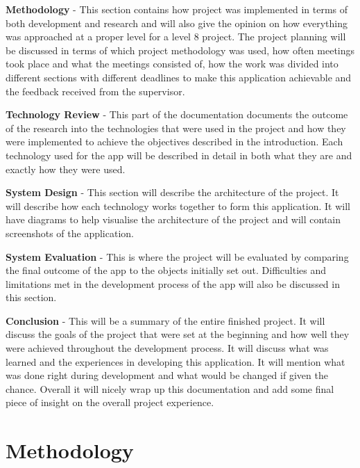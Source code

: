 \textbf {Methodology} - This section contains how project was implemented in terms of both development and research and will also give the opinion on how everything was approached at a proper level for a level 8 project. The project planning will be discussed in terms of which project methodology was used, how often meetings took place and what the meetings consisted of, how the work was divided into different sections with different deadlines to make this application achievable and the feedback received from the supervisor.


\textbf {Technology Review} - This part of the documentation documents the outcome of the research into the technologies that were used in the project and how they were implemented to achieve the objectives described in the introduction. Each technology used for the app will be described in detail in both what they are and exactly how they were used.

\textbf {System Design} - This section will describe the architecture of the project. It will describe how each technology works together to form this application. It will have diagrams to help visualise the architecture of the project and will contain screenshots of the application.

\textbf {System Evaluation} - This is where the project will be evaluated by comparing the final outcome of the app to the objects initially set out. Difficulties and limitations met in the development process of the app will also be discussed in this section.

\textbf {Conclusion} - This will be a summary of the entire finished project. It will discuss the goals of the project that were set at the beginning and how well they were achieved throughout the development process. It will discuss what was learned and the experiences in developing this application. It will mention what was done right during development and what would be changed if given the chance. Overall it will nicely wrap up this documentation and add some final piece of insight on the overall project experience.

\chapter{Methodology}
